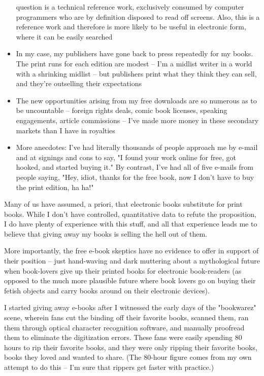 \begin{itemize}
  question is a technical reference work, exclusively consumed by
  computer programmers who are by definition disposed to read off
  screens. Also, this is a reference work and therefore is more
  likely to be useful in electronic form, where it can be easily
  searched
\item
  In my case, my publishers have gone back to press repeatedly for my
  books. The print runs for each edition are modest -- I'm a midlist
  writer in a world with a shrinking midlist -- but publishers print
  what they think they can sell, and they're outselling their
  expectations
\item
  The new opportunities arising from my free downloads are so
  numerous as to be uncountable -- foreign rights deals, comic book
  licenses, speaking engagements, article commissions -- I've made
  more money in these secondary markets than I have in royalties
\item
  More anecdotes: I've had literally thousands of people approach me
  by e-mail and at signings and cons to say, "I found your work
  online for free, got hooked, and started buying it." By contrast,
  I've had all of five e-mails from people saying, "Hey, idiot,
  thanks for the free book, now I don't have to buy the print
  edition, ha ha!"
\end{itemize}
Many of us have assumed, a priori, that electronic books substitute
for print books. While I don't have controlled, quantitative data
to refute the proposition, I do have plenty of experience with this
stuff, and all that experience leads me to believe that giving away
my books is selling the hell out of them.

More importantly, the free e-book skeptics have no evidence to
offer in support of their position -- just hand-waving and dark
muttering about a mythological future when book-lovers give up
their printed books for electronic book-readers (as opposed to the
much more plausible future where book lovers go on buying their
fetish objects and carry books around on their electronic
devices).

I started giving away e-books after I witnessed the early days of
the "bookwarez" scene, wherein fans cut the binding off their
favorite books, scanned them, ran them through optical character
recognition software, and manually proofread them to eliminate the
digitization errors. These fans were easily spending 80 hours to
rip their favorite books, and they were only ripping their favorite
books, books they loved and wanted to share. (The 80-hour figure
comes from my own attempt to do this -- I'm sure that rippers get
faster with practice.)

